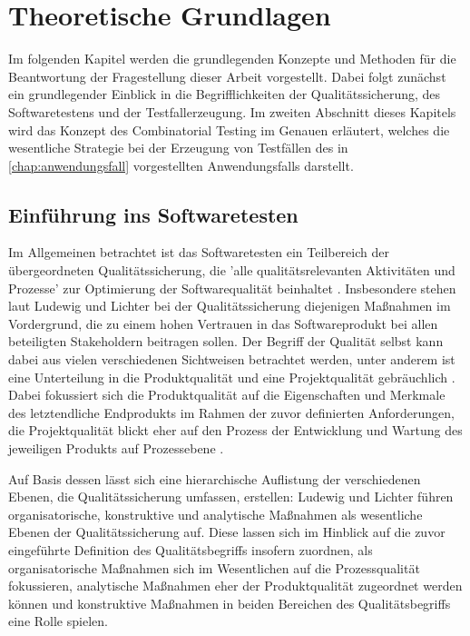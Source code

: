 \chapter{Theoretische Grundlagen}\label{chap:theorie}

Im folgenden Kapitel werden die grundlegenden Konzepte und Methoden für die Beantwortung der Fragestellung dieser Arbeit vorgestellt. Dabei folgt zunächst ein grundlegender Einblick in die Begrifflichkeiten der Qualitätssicherung, des Softwaretestens und der Testfallerzeugung. Im zweiten Abschnitt dieses Kapitels wird das Konzept des Combinatorial Testing im Genauen erläutert, welches die wesentliche Strategie bei der Erzeugung von Testfällen des in \autoref{chap:anwendungsfall} vorgestellten Anwendungsfalls darstellt.

\section{Einführung ins Softwaretesten}\label{sec:einführungTest}

Im Allgemeinen betrachtet ist das Softwaretesten ein Teilbereich der übergeordneten Qualitätssicherung, die 'alle qualitätsrelevanten Aktivitäten und Prozesse' zur Optimierung der Softwarequalität beinhaltet \cite[S. 269]{ludewig2010software}. Insbesondere stehen laut Ludewig und Lichter \cite{ludewig2010software} bei der Qualitätssicherung diejenigen Maßnahmen im Vordergrund, die zu einem hohen Vertrauen in das Softwareprodukt bei allen beteiligten Stakeholdern beitragen sollen. Der Begriff der Qualität selbst kann dabei aus vielen verschiedenen Sichtweisen betrachtet werden, unter anderem ist eine Unterteilung in die Produktqualität und eine Projektqualität gebräuchlich \cite[S. 66]{ludewig2010software}. Dabei fokussiert sich die Produktqualität auf die Eigenschaften und Merkmale des letztendliche Endprodukts im Rahmen der zuvor definierten Anforderungen, die Projektqualität blickt eher auf den Prozess der Entwicklung und Wartung des jeweiligen Produkts auf Prozessebene \cite[S. 66 ff.]{ludewig2010software}. 

Auf Basis dessen lässt sich eine hierarchische Auflistung der verschiedenen Ebenen, die Qualitätssicherung umfassen, erstellen: Ludewig und Lichter \cite[S. 271 ff.]{ludewig2010software} führen organisatorische, konstruktive und analytische Maßnahmen als wesentliche Ebenen der Qualitätssicherung auf. Diese lassen sich im Hinblick auf die zuvor eingeführte Definition des Qualitätsbegriffs insofern zuordnen, als organisatorische Maßnahmen sich im Wesentlichen auf die Prozessqualität fokussieren, analytische Maßnahmen eher der Produktqualität zugeordnet werden können und konstruktive Maßnahmen in beiden Bereichen des Qualitätsbegriffs eine Rolle spielen.

